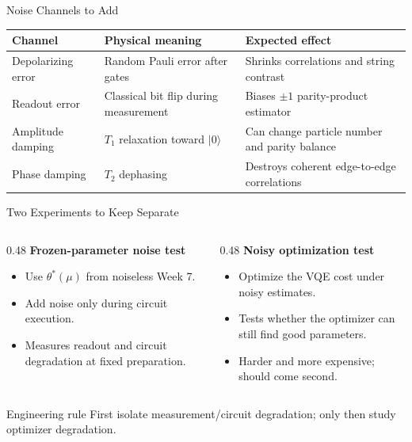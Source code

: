 \documentclass[aspectratio=169,12pt]{beamer}
\newcommand{\ket}[1]{|#1\rangle}
\begin{document}
\begin{frame}{Noise Channels to Add}
  \begin{center}
  \begin{tabular}{p{}p{}p{}}
    \textbf{Channel} & \textbf{Physical meaning} & \textbf{Expected effect} \\
    \hline
    Depolarizing error & Random Pauli error after gates & Shrinks correlations and string contrast \\
    Readout error & Classical bit flip during measurement & Biases $\pm1$ parity-product estimator \\
    Amplitude damping & $T_1$ relaxation toward $\ket{0}$ & Can change particle number and parity balance \\
    Phase damping & $T_2$ dephasing & Destroys coherent edge-to-edge correlations
  \end{tabular}
  \end{center}

\end{frame}

\begin{frame}{Two Experiments to Keep Separate}
  \begin{columns}[T]
    \begin{column}{0.48\textwidth}
      \textbf{Frozen-parameter noise test}
      \begin{itemize}
        \item Use $\theta^*(\mu)$ from noiseless Week 7.
        \item Add noise only during circuit execution.
        \item Measures readout and circuit degradation at fixed preparation.
      \end{itemize}
    \end{column}
    \begin{column}{0.48\textwidth}
      \textbf{Noisy optimization test}
      \begin{itemize}
        \item Optimize the VQE cost under noisy estimates.
        \item Tests whether the optimizer can still find good parameters.
        \item Harder and more expensive; should come second.
      \end{itemize}
    \end{column}
  \end{columns}

  \begin{block}{Engineering rule}
    First isolate measurement/circuit degradation; only then study optimizer degradation.
  \end{block}
\end{frame}
\end{document}
